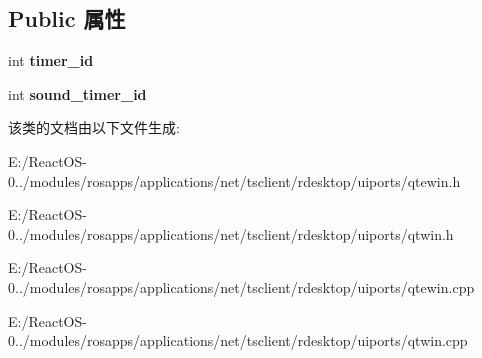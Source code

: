 \subsection*{Public 属性}
\begin{DoxyCompactItemize}
\item 
\mbox{\label{class_q_my_scroll_view_a4688ef54b959051fbeef0c2311770286}} 
int {\bfseries timer\+\_\+id}
\item 
\mbox{\label{class_q_my_scroll_view_a69647da48baeeedbc880f98461fa34e6}} 
int {\bfseries sound\+\_\+timer\+\_\+id}
\end{DoxyCompactItemize}


该类的文档由以下文件生成\+:\begin{DoxyCompactItemize}
\item 
E\+:/\+React\+O\+S-\/0../modules/rosapps/applications/net/tsclient/rdesktop/uiports/qtewin.\+h\item 
E\+:/\+React\+O\+S-\/0../modules/rosapps/applications/net/tsclient/rdesktop/uiports/qtwin.\+h\item 
E\+:/\+React\+O\+S-\/0../modules/rosapps/applications/net/tsclient/rdesktop/uiports/qtewin.\+cpp\item 
E\+:/\+React\+O\+S-\/0../modules/rosapps/applications/net/tsclient/rdesktop/uiports/qtwin.\+cpp\end{DoxyCompactItemize}
